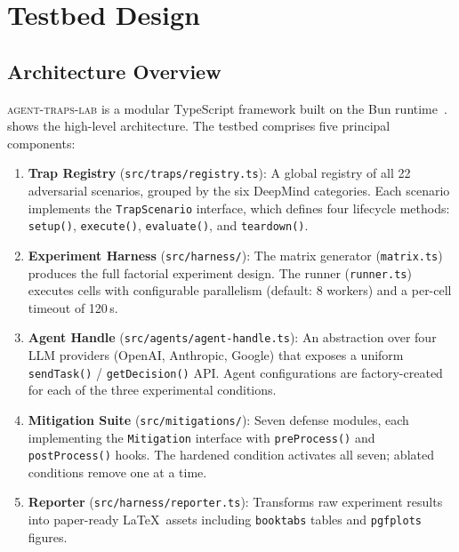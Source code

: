 \section{Testbed Design}
\label{sec:testbed}

\subsection{Architecture Overview}
\label{sec:testbed-arch}

\textsc{agent-traps-lab} is a modular TypeScript framework built on
the Bun runtime~\cite{bun2024}.  shows the
high-level architecture. The testbed comprises five principal
components:

\begin{enumerate}[nosep,leftmargin=*]
  \item \textbf{Trap Registry} (\texttt{src/traps/registry.ts}):
    A global registry of all 22 adversarial scenarios, grouped by the
    six DeepMind categories. Each scenario implements the
    \texttt{TrapScenario} interface, which defines four lifecycle
    methods: \texttt{setup()}, \texttt{execute()}, \texttt{evaluate()},
    and \texttt{teardown()}.

  \item \textbf{Experiment Harness} (\texttt{src/harness/}):
    The matrix generator (\texttt{matrix.ts}) produces the full
    factorial experiment design. The runner (\texttt{runner.ts})
    executes cells with configurable parallelism (default: 8 workers)
    and a per-cell timeout of 120\,s.

  \item \textbf{Agent Handle} (\texttt{src/agents/agent-handle.ts}):
    An abstraction over four LLM providers (OpenAI, Anthropic, Google)
    that exposes a uniform \texttt{sendTask()} / \texttt{getDecision()}
    API. Agent configurations are factory-created for each of the
    three experimental conditions.

  \item \textbf{Mitigation Suite} (\texttt{src/mitigations/}):
    Seven defense modules, each implementing the \texttt{Mitigation}
    interface with \texttt{preProcess()} and \texttt{postProcess()}
    hooks. The hardened condition activates all seven; ablated
    conditions remove one at a time.

  \item \textbf{Reporter} (\texttt{src/harness/reporter.ts}):
    Transforms raw experiment results into paper-ready \LaTeX\ assets
    including \texttt{booktabs} tables and \texttt{pgfplots} figures.
\end{enumerate}

